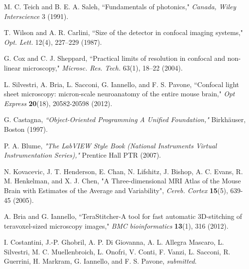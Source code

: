 \documentclass[12pt]{spieman}  %
\begin{document}
\begin{thebibliography}{0}
 M. C. Teich and B. E. A. Saleh, ``Fundamentals of photonics," \emph{Canada, Wiley Interscience} 3 (1991).

 T. Wilson and A. R. Carlini, ``Size of the detector in confocal imaging systems," \emph{Opt. Lett.} 12(4), 227–229 (1987).

 G. Cox and C. J. Sheppard, ``Practical limits of resolution in confocal and non-linear microscopy," \emph{Microsc. Res. Tech.} 63(1), 18–22 (2004).
 

 L. Silvestri, A. Bria, L. Sacconi, G. Iannello,  and F. S. Pavone,  ``Confocal light sheet microscopy: micron-scale neuroanatomy of the entire mouse brain," \emph{Opt Express} \textbf{20}(18), 20582-20598 (2012).

 G. Castagna, \emph{``Object-Oriented Programming A Unified Foundation,"} Birkh{\"a}user, Boston (1997).

 P. A. Blume, \emph{"The LabVIEW Style Book (National Instruments Virtual Instrumentation Series),"} Prentice Hall PTR (2007).

 N. Kovacevic, J. T. Henderson, E. Chan, N. Lifshitz, J. Bishop, A. C. Evans, R. M. Henkelman, and X. J. Chen, "A Three-dimensional MRI Atlas of the Mouse Brain with Estimates of the Average and Variability", \emph{Cereb. Cortex} \textbf{15}(5), 639-45 (2005).



 A. Bria and G. Iannello,  ``TeraStitcher-A tool for fast automatic 3D-stitching of teravoxel-sized microscopy images,"  \emph{BMC bioinformatics} \textbf{13}(1), 316 (2012).

 I. Costantini, J.-P. Ghobril, A. P. Di Giovanna, A. L. Allegra Mascaro, L. Silvestri, M. C. Muellenbroich, L. Onofri, V. Conti, F. Vanzi, L. Sacconi, R. Guerrini, H. Markram, G. Iannello, and F. S. Pavone, \emph{submitted}.

\end{thebibliography}


\listoffigures
\end{document}
